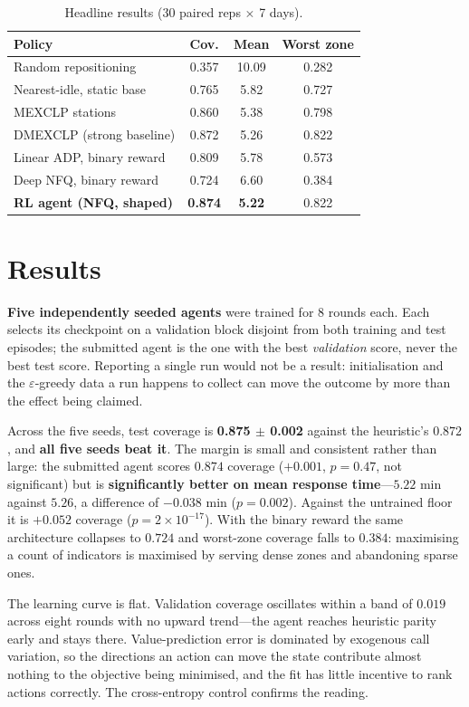\documentclass[10pt,twocolumn,a4paper]{article}
\begin{document}
\begin{table}[t]
\centering\small
\caption{Headline results (30 paired reps $\times$ 7 days).}
\begin{tabular}{lccc}
\toprule
Policy & Cov. & Mean & Worst zone \\
\midrule
Random repositioning      & 0.357 & 10.09 & 0.282 \\
Nearest-idle, static base & 0.765 & 5.82  & 0.727 \\
MEXCLP stations           & 0.860 & 5.38  & 0.798 \\
\midrule
DMEXCLP (strong baseline) & 0.872 & 5.26  & 0.822 \\
Linear ADP, binary reward & 0.809 & 5.78  & 0.573 \\
Deep NFQ, binary reward   & 0.724 & 6.60  & 0.384 \\
\textbf{RL agent (NFQ, shaped)} & \textbf{0.874} & \textbf{5.22} & 0.822 \\
\bottomrule
\end{tabular}
\end{table}

\section{Results}
\textbf{Five independently seeded agents} were trained for 8 rounds each. Each selects its
checkpoint on a validation block disjoint from both training and test episodes; the
submitted agent is the one with the best \emph{validation} score, never the best test
score. Reporting a single run would not be a result: initialisation and the
$\varepsilon$-greedy data a run happens to collect can move the outcome by more than the
effect being claimed.

Across the five seeds, test coverage is \textbf{0.875 $\pm$ 0.002} against the heuristic's
$0.872$, and \textbf{all five seeds beat it}. The margin is small and consistent rather
than large: the submitted agent scores $0.874$ coverage ($+0.001$, $p = 0.47$, not
significant) but is \textbf{significantly better on mean response time}---$5.22$ min
against $5.26$, a difference of $-0.038$ min ($p = 0.002$). Against the untrained floor it
is $+0.052$ coverage ($p = 2\times10^{-17}$). With the binary reward the same architecture
collapses to $0.724$ and worst-zone coverage falls to $0.384$: maximising a count of
indicators is maximised by serving dense zones and abandoning sparse ones.

The learning curve is flat. Validation coverage oscillates within a band of $0.019$ across
eight rounds with no upward trend---the agent reaches heuristic parity early and stays
there. Value-prediction error is dominated by exogenous call variation, so the directions
an action can move the state contribute almost nothing to the objective being minimised,
and the fit has little incentive to rank actions correctly. The cross-entropy control
confirms the reading.
\end{document}
